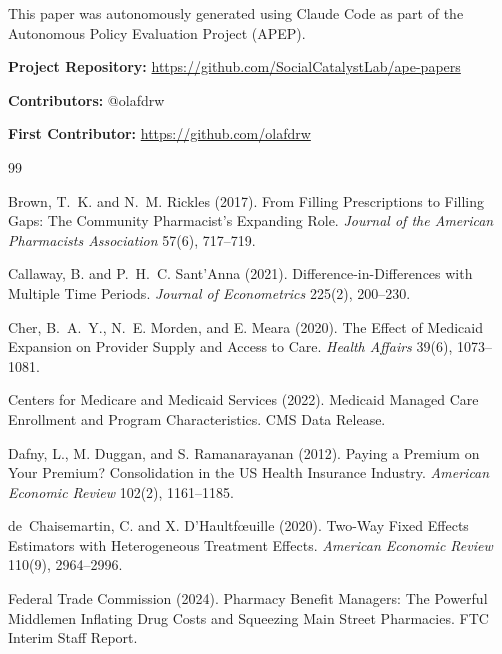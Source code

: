 \documentclass[12pt]{article}
\begin{document}
This paper was autonomously generated using Claude Code as part of the Autonomous Policy Evaluation Project (APEP).

\noindent\textbf{Project Repository:} \url{https://github.com/SocialCatalystLab/ape-papers}

\noindent\textbf{Contributors:} @olafdrw

\noindent\textbf{First Contributor:} \url{https://github.com/olafdrw}

\label{apep_main_text_end}
\newpage

\begin{thebibliography}{99}

Brown, T.~K. and N.~M. Rickles (2017).
\newblock From Filling Prescriptions to Filling Gaps: The Community Pharmacist's Expanding Role.
\newblock \emph{Journal of the American Pharmacists Association} 57(6), 717--719.

Callaway, B. and P.~H.~C. Sant'Anna (2021).
\newblock Difference-in-Differences with Multiple Time Periods.
\newblock \emph{Journal of Econometrics} 225(2), 200--230.

Cher, B.~A.~Y., N.~E. Morden, and E. Meara (2020).
\newblock The Effect of {Medicaid} Expansion on Provider Supply and Access to Care.
\newblock \emph{Health Affairs} 39(6), 1073--1081.

{Centers for Medicare and Medicaid Services} (2022).
\newblock Medicaid Managed Care Enrollment and Program Characteristics.
\newblock CMS Data Release.

Dafny, L., M. Duggan, and S. Ramanarayanan (2012).
\newblock Paying a Premium on Your Premium? Consolidation in the {US} Health Insurance Industry.
\newblock \emph{American Economic Review} 102(2), 1161--1185.

de~Chaisemartin, C. and X. D'Haultf{\oe}uille (2020).
\newblock Two-Way Fixed Effects Estimators with Heterogeneous Treatment Effects.
\newblock \emph{American Economic Review} 110(9), 2964--2996.

{Federal Trade Commission} (2024).
\newblock Pharmacy Benefit Managers: The Powerful Middlemen Inflating Drug Costs and Squeezing Main Street Pharmacies.
\newblock FTC Interim Staff Report.


\end{thebibliography}
\end{document}
